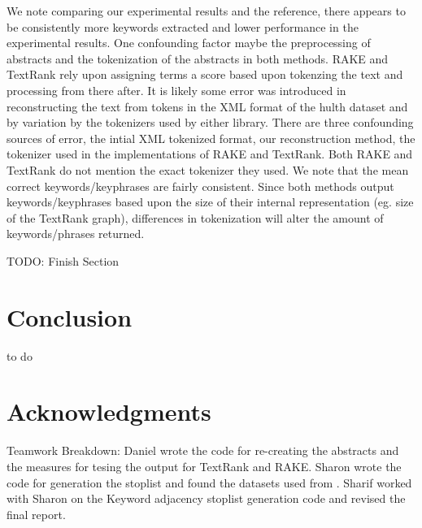 \documentclass[11pt,a4paper]{article}
\begin{document}
We note comparing our experimental results and the reference, there appears to be consistently more keywords extracted and lower performance in the experimental results. One confounding factor maybe the preprocessing of abstracts and the tokenization of the abstracts in both methods. RAKE and TextRank rely upon assigning terms a score based upon tokenzing the text and processing from there after. It is likely some error was introduced in reconstructing the text from tokens in the XML format of the hulth dataset and by variation by the tokenizers used by either library. There are three confounding sources of error, the intial XML tokenized format, our reconstruction method, the tokenizer used in the implementations of RAKE and TextRank. Both RAKE and TextRank do not mention the exact tokenizer they used. We note that the mean correct keywords/keyphrases are fairly consistent. Since both methods output keywords/keyphrases based upon the size of their internal representation (eg. size of the TextRank graph), differences in tokenization will alter the amount of keywords/phrases returned.

TODO: Finish Section


\section{Conclusion}

to do 

\section{Acknowledgments}

Teamwork Breakdown: Daniel wrote the code for re-creating the abstracts and the measures for tesing the output for TextRank and RAKE. Sharon wrote the code for generation the stoplist and found the datasets used from \citet{hulth-2003-improved}. Sharif worked with Sharon on the Keyword adjacency stoplist generation code and revised the final report. 
 

%
%




\end{document}

